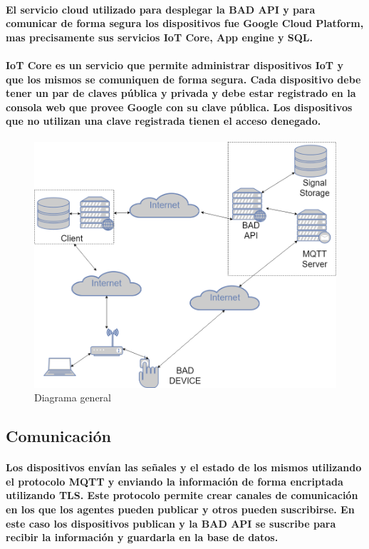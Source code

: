 \documentclass{article}
\begin{document}
\paragraph{
El servicio cloud utilizado para desplegar la BAD API y para comunicar de forma segura los dispositivos fue Google Cloud Platform, mas precisamente sus servicios IoT Core, App engine y SQL.
}
\paragraph{
IoT Core es un servicio que permite administrar dispositivos IoT y que los mismos se comuniquen de forma segura. Cada dispositivo debe tener un par de claves pública y privada y debe estar registrado en la consola web que provee Google con su clave pública. Los dispositivos que no utilizan una clave registrada tienen el acceso denegado.
}

\begin{figure}[ht]
    \centering
    \includegraphics[width=\textwidth]{diagrama_general.png}%
    \caption{Diagrama general}
    \label{fig:generaldiagram}
\end{figure}

\subsection{Comunicación}
\paragraph{
Los dispositivos envían las señales y el estado de los mismos utilizando el protocolo MQTT y enviando la información de forma encriptada utilizando TLS. Este protocolo permite crear canales de comunicación en los que los agentes pueden publicar y otros pueden suscribirse. En este caso los dispositivos publican y la BAD API se suscribe para recibir la información y guardarla en la base de datos.
}
\end{document}
